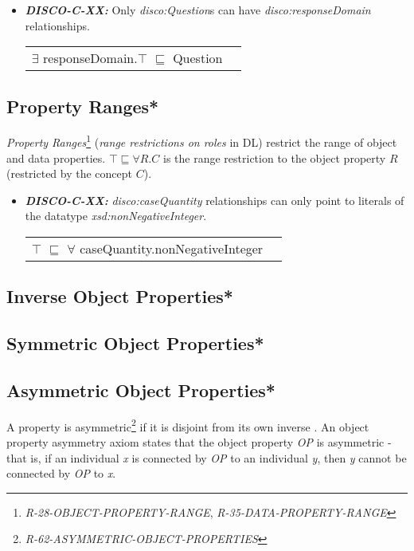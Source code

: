 \documentclass{llncs}
\newenvironment{DL}{
  \vspace{0cm}
  \begin{tabular}{r l}

}{
  \end{tabular}
}
\begin{document}
\begin{itemize}
	\item \textbf{{\em DISCO-C-XX:}} 
Only {\em disco:Question}s can have {\em disco:responseDomain} relationships.

\begin{DL}
$\exists$ responseDomain.$\top$ $\sqsubseteq$ Question 
\end{DL}
\end{itemize}

\subsection{Property Ranges*}

{\em Property Ranges}\footnote{{\em R-28-OBJECT-PROPERTY-RANGE}, {\em R-35-DATA-PROPERTY-RANGE}} ({\em range restrictions on roles} in DL) restrict the range of object and data properties.
$\top \sqsubseteq \forall R . C$ is the range restriction to the object property $R$ (restricted by the concept $C$). 

\begin{itemize}
	\item \textbf{{\em DISCO-C-XX:}} 
{\em disco:caseQuantity} relationships can only point to literals of the datatype {\em xsd:nonNegativeInteger}.

\begin{DL}
$\top$ $\sqsubseteq$ $\forall$ caseQuantity.nonNegativeInteger \\
\end{DL}
\end{itemize}

\subsection{Inverse Object Properties*}

\subsection{Symmetric Object Properties*}

\subsection{Asymmetric Object Properties*}

A property is asymmetric\footnote{{\em R-62-ASYMMETRIC-OBJECT-PROPERTIES}} if it is disjoint from its own inverse \cite{Kroetzsch2012}.
An object property asymmetry axiom states that the object property \emph{OP} is asymmetric - that is, if an individual \emph{x} is connected by \emph{OP} to an individual \emph{y}, then \emph{y} cannot be connected by \emph{OP} to \emph{x}. 
\end{document}
